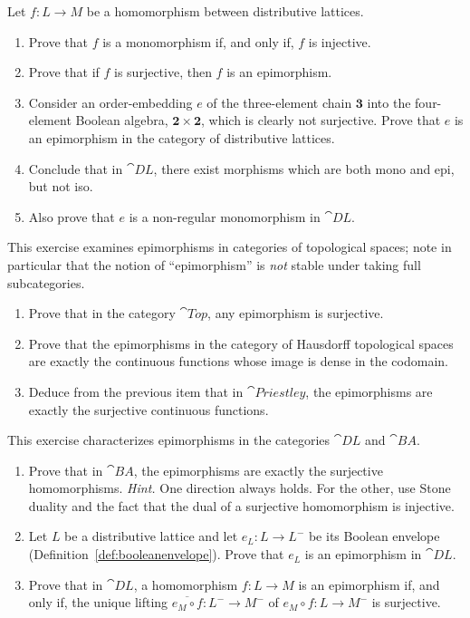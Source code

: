 \exercises
\begin{exercise}\label{exe:monoepiconcrete}
Let $f \colon L \to M$ be a homomorphism between distributive lattices.
\begin{enumerate}
\item Prove that $f$ is a monomorphism if, and only if, $f$ is injective.
\item Prove that if $f$ is surjective, then $f$ is an epimorphism.
\item Consider an order-embedding $e$ of the three-element chain $\mathbf{3}$ into the four-element Boolean algebra, $\mathbf{2} \times \mathbf{2}$, which is clearly not surjective. Prove that $e$ is an epimorphism in the category of distributive lattices.
\item Conclude that in $\cat{DL}$, there exist morphisms which are both mono and epi, but not iso.
\item Also prove that $e$ is a non-regular monomorphism in $\cat{DL}$.
\end{enumerate}
\end{exercise}
\begin{exercise}
\label{exe:spacesepi}
This exercise examines epimorphisms in categories of topological spaces; note in particular that the notion of ``epimorphism'' is \emph{not} stable under taking full subcategories.
\begin{enumerate}
  \item Prove that in the category $\cat{Top}$, any epimorphism is surjective.
  \item Prove that the epimorphisms in the category of Hausdorff topological spaces are exactly the continuous functions whose image is dense in the codomain. 
  \item Deduce from the previous item that in $\cat{Priestley}$, the epimorphisms are exactly the surjective continuous functions. 
\end{enumerate}
\end{exercise}
\begin{exercise}
\label{exe:booleanepi}
This exercise characterizes epimorphisms in the categories $\cat{DL}$ and $\cat{BA}$.
\begin{enumerate}
\item Prove that in $\cat{BA}$, the epimorphisms are exactly the surjective homomorphisms. {\it Hint.} One direction always holds. For the other, use Stone duality and the fact that the dual of a surjective homomorphism is injective.
\item Let $L$ be a distributive lattice and let $e_L \colon L \to L^-$ be its Boolean envelope (Definition~\ref{def:booleanenvelope}). Prove that $e_L$ is an epimorphism in $\cat{DL}$.
\item Prove that in $\cat{DL}$, a homomorphism $f \colon L \to M$ is an epimorphism if, and only if, the unique lifting $\overline{e_M \circ f} \colon L^- \to M^-$ of $e_M \circ f \colon L \to M^-$ is surjective.
\end{enumerate}
\end{exercise}





